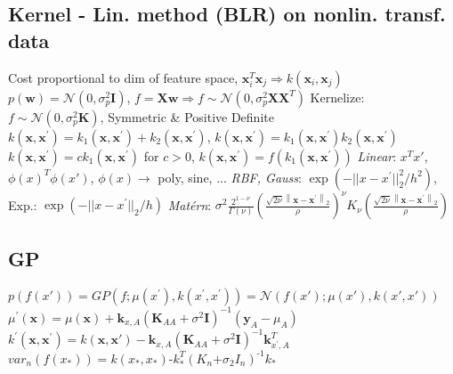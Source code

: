 \documentclass[a4paper, 11pt, landscape]{article}
\begin{document}
\begin{multicols*}{3}
\subsection{Kernel - Lin. method (BLR) on nonlin. transf. data}
Cost proportional to dim of feature space, $\mathbf{x}_i^T \mathbf{x}_j \Longrightarrow k(\mathbf{x}_i,\mathbf{x}_j)$
\newline $p(\mathbf{w})=\mathcal{N}(0, \sigma_p^2 \mathbf{I})$, \space\space $f = \mathbf{X} \mathbf{w} \Longrightarrow f \sim \mathcal{N}(0, \sigma_p^2 \mathbf{X}\mathbf{X}^T)$
\newline Kernelize: $f \sim \mathcal{N}(0, \sigma_p^2 \mathbf{K})$, Symmetric \& Positive Definite
\newline $k\left(\mathbf{x}, \mathbf{x}^{\prime}\right)=k_{1}\left(\mathbf{x}, \mathbf{x}^{\prime}\right)+k_{2}\left(\mathbf{x}, \mathbf{x}^{\prime}\right)$, \space\space $k\left(\mathbf{x}, \mathbf{x}^{\prime}\right)=k_{1}\left(\mathbf{x}, \mathbf{x}^{\prime}\right) k_{2}\left(\mathbf{x}, \mathbf{x}^{\prime}\right)$
\newline $k\left(\mathbf{x}, \mathbf{x}^{\prime}\right)=c k_{1}\left(\mathbf{x}, \mathbf{x}^{\prime}\right)$ for $c>0$, \space\space $k\left(\mathbf{x}, \mathbf{x}^{\prime}\right)=f\left(k_{1}\left(\mathbf{x}, \mathbf{x}^{\prime}\right)\right)$
\newline \textit{Linear}: $x^Tx'$, $\phi(x)^T\phi(x')$, $\phi(x) \rightarrow$ poly, sine, ...
\newline \textit{RBF, Gauss}: $\exp \left(-|| x-x^{\prime}||_{2}^{2} / h^{2}\right)$, Exp.: $\exp \left(-|| x-x^{\prime}||_{2} / h\right)$
\newline \textit{Matérn}: $\sigma^2\frac{2^{1-\nu}}{\Gamma(\nu)}\left(\frac{\sqrt{2 \nu}\left\|\mathbf{x}-\mathbf{x}^{\prime}\right\|_{2}}{\rho}\right)^{\nu} K_{\nu}\left(\frac{\sqrt{2 \nu}\left\|\mathbf{x}-\mathbf{x}^{\prime}\right\|_{2}}{\rho}\right)$

\subsection{GP}
$p(f(x'))=G P\left(f ; \mu(x^{\prime}), k(x^{\prime},x^{\prime})\right)=\mathcal{N}(f(x') ; \mu(x') , k(x', x'))$
\newline $\mu^{\prime}(\mathbf{x})=\mu(\mathbf{x})+\mathbf{k}_{x, A}\left(\mathbf{K}_{A A}+\sigma^{2} \mathbf{I}\right)^{-1}\left(\mathbf{y}_{A}-\mu_{A}\right)$
\newline $k^{\prime}\left(\mathbf{x}, \mathbf{x}^{\prime}\right)=k(\mathbf{x}, \mathbf{x'})-\mathbf{k}_{x, A}\left(\mathbf{K}_{A A}+\sigma^{2} \mathbf{I}\right)^{-1} \mathbf{k}_{x^{\prime}, A}^{T}$
\newline $var_n(f(x_*))=k(x_*,x_*)\text{-}k_*^T(K_n\text{+}\sigma_2 I_n)^{\text{-}1}k_*$


\end{multicols*}
\end{document}
